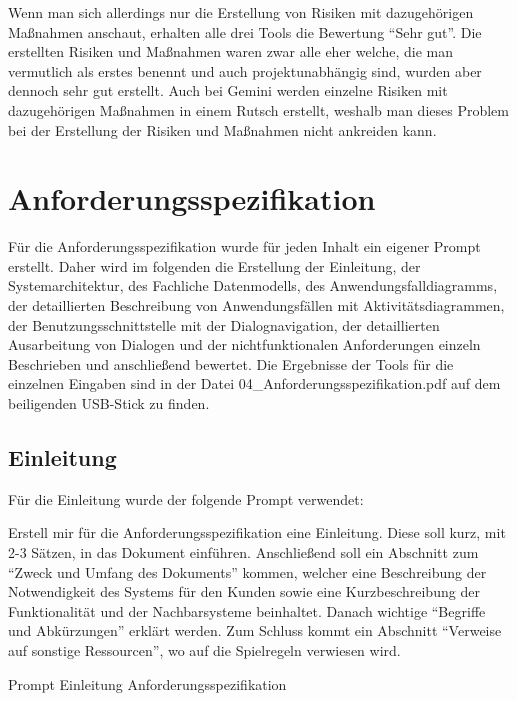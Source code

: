 Wenn man sich allerdings nur die Erstellung von Risiken mit dazugehörigen Maßnahmen anschaut, erhalten alle drei 
Tools die Bewertung ``Sehr gut''. Die erstellten Risiken und Maßnahmen waren zwar alle eher welche, die man vermutlich 
als erstes benennt und auch projektunabhängig sind, wurden aber dennoch sehr gut erstellt. Auch bei Gemini werden 
einzelne Risiken mit dazugehörigen Maßnahmen in einem Rutsch erstellt, weshalb man dieses Problem bei der Erstellung 
der Risiken und Maßnahmen nicht ankreiden kann.

\section{Anforderungsspezifikation}  \label{CompAnforderungsspezifikation}

Für die Anforderungsspezifikation wurde für jeden Inhalt ein eigener Prompt erstellt. Daher wird im folgenden die Erstellung der Einleitung, 
der Systemarchitektur, des Fachliche Datenmodells, des Anwendungsfalldiagramms, der detaillierten Beschreibung von Anwendungsfällen mit Aktivitätsdiagrammen, 
der Benutzungsschnittstelle mit der Dialognavigation, der detaillierten Ausarbeitung von Dialogen und der nichtfunktionalen Anforderungen einzeln
Beschrieben und anschließend bewertet. Die Ergebnisse der Tools für die einzelnen Eingaben sind in der Datei 04\_Anforderungsspezifikation.pdf auf 
dem beiligenden USB-Stick zu finden.

\subsection*{Einleitung}

Für die Einleitung wurde der folgende Prompt verwendet:

\begin{prompt}[H]
    \begin{tcolorbox}[colback=gray!20, colframe=gray!20, boxrule=0pt, sharp corners] 
        Erstell mir für die Anforderungsspezifikation eine Einleitung. Diese soll kurz, mit 2-3 Sätzen, in das Dokument einführen. Anschließend soll 
        ein Abschnitt zum ``Zweck und Umfang des Dokuments'' kommen, welcher eine Beschreibung der Notwendigkeit des Systems für den Kunden sowie eine 
        Kurzbeschreibung der Funktionalität und der Nachbarsysteme beinhaltet. Danach wichtige ``Begriffe und Abkürzungen'' erklärt werden. Zum Schluss 
        kommt ein Abschnitt ``Verweise auf sonstige Ressourcen'', wo auf die Spielregeln verwiesen wird.
        \vfill
    \end{tcolorbox}
    \caption{Prompt Einleitung Anforderungsspezifikation}
    \label{Prompt Einleitung Anforderungsspezifikation}
\end{prompt}

